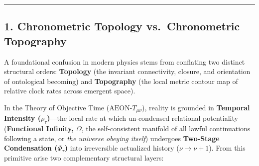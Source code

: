 \documentclass[
]{article}
\begin{document}
\begin{center}\rule{0.5\linewidth}{0.5pt}\end{center}

\subsection{1. Chronometric Topology vs.~Chronometric
Topography}\label{chronometric-topology-vs.-chronometric-topography}

A foundational confusion in modern physics stems from conflating two
distinct structural orders: \textbf{Topology} (the invariant
connectivity, closure, and orientation of ontological becoming) and
\textbf{Topography} (the local metric contour map of relative clock
rates across emergent space).

In the Theory of Objective Time (\(\text{AEON-}T_{\mu\nu}\)), reality is
grounded in \textbf{Temporal Intensity (\(\rho_\tau\))}---the local rate
at which un-condensed relational potentiality (\textbf{Functional
Infinity, \(\Omega\)}, the self-consistent manifold of all lawful
continuations following a state, or \emph{the universe obeying itself})
undergoes \textbf{Two-Stage Condensation (\(\Phi_\tau\))} into
irreversible actualized history (\(\nu \to \nu + 1\)). From this
primitive arise two complementary structural layers:
\end{document}
